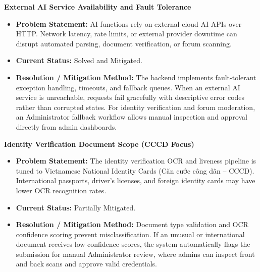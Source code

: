 \begin{description}[leftmargin=2.0cm,labelwidth=1.8cm,align=left,font=\normalfont\bfseries]
\item[LI-06] \textbf{External AI Service Availability and Fault Tolerance}
\begin{itemize}[leftmargin=0.5cm, label=--]
\item \textbf{Problem Statement:} AI functions rely on external cloud AI APIs over HTTP. Network latency, rate limits, or external provider downtime can disrupt automated parsing, document verification, or forum scanning.
\item \textbf{Current Status:} Solved and Mitigated.
\item \textbf{Resolution / Mitigation Method:} The backend implements fault-tolerant exception handling, timeouts, and fallback queues. When an external AI service is unreachable, requests fail gracefully with descriptive error codes rather than corrupted states. For identity verification and forum moderation, an Administrator fallback workflow allows manual inspection and approval directly from admin dashboards.
\end{itemize}

\item[LI-07] \textbf{Identity Verification Document Scope (CCCD Focus)}
\begin{itemize}[leftmargin=0.5cm, label=--]
\item \textbf{Problem Statement:} The identity verification OCR and liveness pipeline is tuned to Vietnamese National Identity Cards ({\selectfont Căn cước công dân} -- CCCD). International passports, driver's licenses, and foreign identity cards may have lower OCR recognition rates.
\item \textbf{Current Status:} Partially Mitigated.
\item \textbf{Resolution / Mitigation Method:} Document type validation and OCR confidence scoring prevent misclassification. If an unusual or international document receives low confidence scores, the system automatically flags the submission for manual Administrator review, where admins can inspect front and back scans and approve valid credentials.
\end{itemize}


\end{description}
